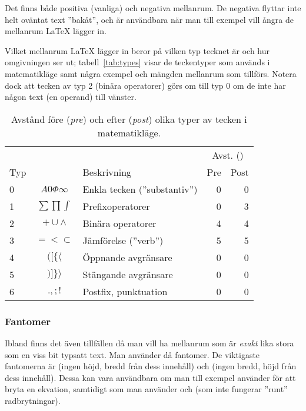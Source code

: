 \documentclass[../../a4.tex]{subfiles}
\begin{document}
Det finns både positiva (vanliga) och negativa mellanrum. De negativa
flyttar inte helt oväntat text ”bakåt”, och är användbara när man till
exempel vill ångra de mellanrum \LaTeX{} lägger in.

Vilket mellanrum \LaTeX{} lägger in beror på vilken typ tecknet är och
hur omgivningen ser ut; tabell~\vref{tab:types} visar de teckentyper som
används i matematikläge samt några exempel och mängden mellanrum som
tillförs. Notera dock att tecken av typ 2 (binära operatorer) görs om till
typ 0 om de inte har någon text (en operand) till vänster.

\begin{table}[tbp]
	\centering 
	\caption{Avstånd före (\emph{pre}) och efter (\emph{post}) olika typer
	av tecken i matematikläge.}
	\label{tab:types}
	\begin{tabular}{lclrr}
		\toprule 
		& & & \multicolumn{2}{c}{Avst. (\si{\mu})} \\
		\cmidrule{4-5}
		Typ & & Beskrivning & Pre & Post \\
		\midrule 
		0 & \(A 0 \Phi \infty\) & Enkla tecken (”substantiv”) & 0 & 0 \\
		1 & \(\sum \prod \int\) & Prefixoperatorer & 0 & 3 \\
		2 & \(+ \cup \wedge\)   & Binära operatorer & 4 & 4 \\
		3 & \(= < \subset\)     & Jämförelse (”verb”) & 5 & 5 \\
		4 & \(( [ \{ \langle\)  & Öppnande avgränsare & 0 & 0 \\
		5 & \() ] \} \rangle\)  & Stängande avgränsare & 0 & 0 \\
		6 & \(. , ; !\)         & Postfix, punktuation & 0 & 0 \\
		\bottomrule 
	\end{tabular}
\end{table}

\subsubsection{Fantomer}
Ibland finns det även tillfällen då man vill ha mellanrum som är
\emph{exakt} lika stora som en viss bit typsatt text. Man använder då
fantomer. De viktigaste fantomerna är  (ingen höjd, bredd
från dess innehåll) och  (ingen bredd, höjd från dess 
innehåll). Dessa kan vara användbara om man till exempel använder
 för att bryta en ekvation, samtidigt som man använder
 och  (som inte fungerar ”runt” radbrytningar).
\end{document}
